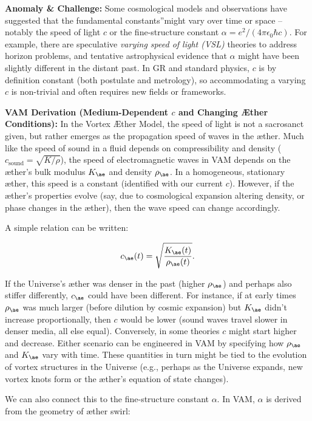 \documentclass[a4paper, aps,preprint,superscriptaddress, 12pt]{revtex4}
\begin{document}
\textbf{Anomaly \& Challenge: } Some cosmological models and observations have suggested that the fundamental \grqq constants\textquotedblright might vary over time or space – notably the speed of light $c$ or the fine-structure constant $\alpha = e^2/(4\pi\epsilon_0\hbar c)$. For example, there are speculative \textit{varying speed of light (VSL)} theories to address horizon problems, and tentative astrophysical evidence that $\alpha$ might have been slightly different in the distant past. In GR and standard physics, $c$ is by definition constant (both postulate and metrology), so accommodating a varying $c$ is non-trivial and often requires new fields or frameworks.


\textbf{VAM Derivation (Medium-Dependent $c$ and Changing Æther Conditions):} In the Vortex Æther Model, the speed of light is not a sacrosanct given, but rather emerges as the propagation speed of waves in the æther. Much like the speed of sound in a fluid depends on compressibility and density ($c_{\text{sound}} = \sqrt{K/\rho}$), the speed of electromagnetic waves in VAM depends on the æther's bulk modulus $K_{\ae}$ and density $\rho_{\ae}$. In a homogeneous, stationary æther, this speed is a constant (identified with our current $c$). However, if the æther's properties evolve (say, due to cosmological expansion altering density, or phase changes in the æther), then the wave speed can change accordingly.


A simple relation can be written:

\begin{equation}
    c_{\ae}(t) = \sqrt{\frac{K_{\ae}(t)}{\rho_{\ae}(t)}}.
\end{equation}

If the Universe's æther was denser in the past (higher $\rho_{\ae}$) and perhaps also stiffer differently, $c_{\ae}$ could have been different. For instance, if at early times $\rho_{\ae}$ was much larger (before dilution by cosmic expansion) but $K_{\ae}$ didn't increase proportionally, then $c$ would be lower (sound waves travel slower in denser media, all else equal). Conversely, in some theories $c$ might start higher and decrease. Either scenario can be engineered in VAM by specifying how $\rho_{\ae}$ and $K_{\ae}$ vary with time. These quantities in turn might be tied to the evolution of vortex structures in the Universe (e.g., perhaps as the Universe expands, new vortex knots form or the æther's equation of state changes).


We can also connect this to the fine-structure constant $\alpha$. In VAM, $\alpha$ is derived from the geometry of æther swirl:
\end{document}
